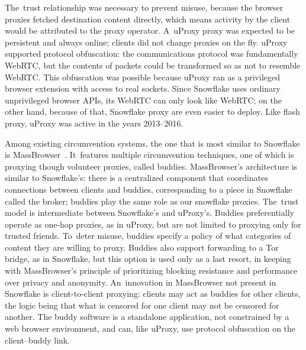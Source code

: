 \documentclass[letterpaper,twocolumn]{article}
\begin{document}
The~trust relationship was necessary to prevent misuse,
because the browser proxies fetched destination content directly,
which means activity by the client would be attributed to the proxy operator.
A~uProxy proxy was expected to be
persistent and always online;
clients did not change proxies on the fly.
uProxy supported protocol obfuscation:
the communications protocol was fundamentally WebRTC,
but the contents of packets could be transformed so as not to resemble WebRTC.
This obfuscation was possible because uProxy ran as a privileged browser extension
with access to real sockets.
Since Snowflake uses ordinary unprivileged browser APIs,
its WebRTC can only look like WebRTC;
on the other hand, because of that,
Snowflake proxy are even easier to deploy.
Like flash proxy, uProxy was active in the years
2013--2016.

Among existing circumvention systems,
the one that is most similar to Snowflake is MassBrowser~\cite{Nasr2020a}.
It~features multiple circumvention techniques, one of which is
proxying though volunteer proxies, called buddies.
MassBrowser's architecture is similar to Snowflake's:
there is a centralized component that coordinates
connections between clients and buddies,
corresponding to a piece in Snowflake called the broker;
buddies play the same role as our snowflake proxies.
The~trust model is intermediate between Snowflake's and uProxy's.
Buddies preferentially operate as one-hop proxies, as in uProxy,
but are not limited to proxying only for trusted friends.
To~deter misuse, buddies specify a policy of
what categories of content they are willing to proxy.
Buddies also support forwarding to a Tor bridge, as in Snowflake,
but this option is used only as a last resort,
in keeping with MassBrowser's principle
of prioritizing blocking resistance and performance
over privacy and anonymity.
An~innovation in MassBrowser not present in Snowflake is client-to-client proxying:
clients may act as buddies for other clients,
the logic being that what is censored for one client may not be censored for another.
The buddy software is a standalone application,
not constrained by a web browser environment,
and can, like uProxy, use protocol obfuscation
on the client--buddy link.
\end{document}
